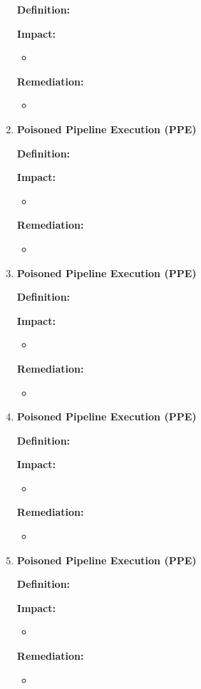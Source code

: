 \begin{enumerate}[label=(\arabic*)]
    \textbf{Definition: }

    \textbf{Impact: }
        \begin{itemize}
            \item
        \end{itemize}
    \textbf{Remediation:}
        \begin{itemize}
            \item
        \end{itemize}
    \item \textbf{Poisoned Pipeline Execution (PPE)}

    \textbf{Definition: }

    \textbf{Impact: }
        \begin{itemize}
            \item
        \end{itemize}
    \textbf{Remediation:}
        \begin{itemize}
            \item
        \end{itemize}
    \item \textbf{Poisoned Pipeline Execution (PPE)}

    \textbf{Definition: }

    \textbf{Impact: }
        \begin{itemize}
            \item
        \end{itemize}
    \textbf{Remediation:}
        \begin{itemize}
            \item
        \end{itemize}
    \item \textbf{Poisoned Pipeline Execution (PPE)}

    \textbf{Definition: }

    \textbf{Impact: }
        \begin{itemize}
            \item
        \end{itemize}
    \textbf{Remediation:}
        \begin{itemize}
            \item
        \end{itemize}
    \item \textbf{Poisoned Pipeline Execution (PPE)}

    \textbf{Definition: }

    \textbf{Impact: }
        \begin{itemize}
            \item
        \end{itemize}
    \textbf{Remediation:}
        \begin{itemize}
            \item
        \end{itemize}
\end{enumerate}



